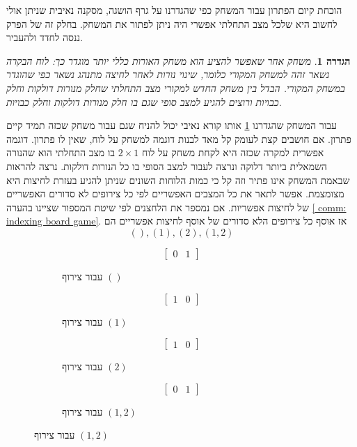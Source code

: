 \documentclass[12pt,leqno]{article}
\theoremstyle{theoremdd}
\newtheorem{definition}{הגדרה}
\begin{document}
הוכחת קיום הפתרון עבור המשחק כפי שהגדרנו  על גרף הושגה, מסקנה נאיבית שניתן אולי לחשוב היא שלכל מצב התחלתי
אפשרי היה ניתן לפתור את המשחק. בחלק זה של הפרק ננסה לחדד ולהעביר.
\begin{definition}
    \label{def:diff-game}
    משחק אחר שאפשר להציע הוא משחק האורות כללי יותר מוגדר כך:
    לוח הבקרה נשאר זהה למשחק המקורי כלומר, שינוי נורות 
    לאחר לחיצה מתנהג נשאר כפי שהוגדר במשחק המקורי.
    הבדל בין משחק החדש למקורי 
    מצב התחלתי שחלק מנורות דולקות וחלק כבויות ורוצים להגיע למצב סופי שגם בו חלק מנורות דולקות וחלק כבויות.
\end{definition}
עבור המשחק שהגדרנו 
\ref{def:diff-game}
אותו קורא נאיבי יכול להניח שגם עבור משחק שכזה תמיד קיים פתרון.
אם חושבים קצת לעומק קל מאד לבנות דוגמה למשחק על לוח, שאין לו פתרון.
דוגמה אפשרית למקרה שכזה היא לקחת משחק על לוח 
$2 \times 1$
בו מצב התחלתי הוא שהנורה השמאלית ביותר דלוקה ונרצה לעבור למצב הסופי בו כל 
הנורות דולקות.
נרצה להראות שבאמת המשחק אינו פתיר וזה קל כי כמות 
הלוחות השונים שניתן להגיע בעזרת לחיצות היא מצומצמת.
אפשר לתאר את כל המצבים האפשריים לפי 
כל צירופים לא סדורים האפשריים של לחיצות אפשריות.
אם נמספר את הלחצנים לפי שיטת המספור שציינו בהערה 
\ref{ comm: indexing board game}.
אז אוסף כל צירופים הלא סדורים 
של אוסף לחיצות אפשריים הם 
\[
    (), (1), (2), (1,2)
\]
\begin{figure}[ht]
    \caption{מצבי הלוחות לאחר לחיצה של צירוף}
    \centering
    \begin{subfigure}{.20\textwidth}
        \caption{
            עבור צירוף
            $()$
        }
        \[
            \begin{bmatrix}
                0 & 1
            \end{bmatrix}
        \]
    \end{subfigure}
    \begin{subfigure}{.20\textwidth}
        \caption{
            עבור צירוף
            $(1)$
        }
        \[
            \begin{bmatrix}
                1 & 0
            \end{bmatrix}
        \]
    \end{subfigure}
    \begin{subfigure}{.20\textwidth}
        \caption{
            עבור צירוף
            $(2)$
        }
        \[
            \begin{bmatrix}
                1 & 0
            \end{bmatrix}
        \]
    \end{subfigure}
    \begin{subfigure}{.20\textwidth}
        \caption{
            עבור צירוף
            $(1, 2)$
        }
        \[
            \begin{bmatrix}
                0 & 1
            \end{bmatrix}
        \]
    \end{subfigure}%
\end{figure}
\end{document}
